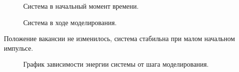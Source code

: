 \documentclass[14pt,a4paper,report]{ncc}
\begin{document}
\begin{figure}[b]
\caption{Система в начальный момент времени.}
\label{ris:image10}
\end{figure}
\begin{figure}[h]
\caption{Система в ходе моделирования.}
\label{ris:image11}
\end{figure}
Положение вакансии не изменилось, система стабильна при малом начальном импульсе.
\begin{figure}[h!]
\caption{График зависимости энергии системы от шага моделирования.}
\label{ris:image12}
\end{figure}
\end{document}

